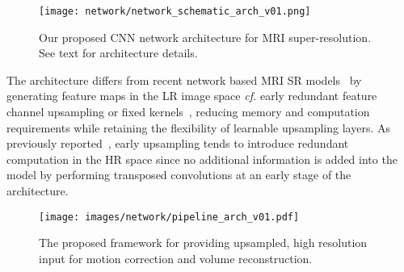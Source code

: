 \documentclass[runningheads,a4paper]{llncs}
\newcommand{\todo}[1]{}
\renewcommand{\todo}[1]{{\color{red} TODO: {#1}}}
\begin{document}

\begin{figure}[!htbp]
\centering
  \texttt{[image: network/network\_schematic\_arch\_v01.png]}
  \caption{Our proposed CNN network architecture for MRI super-resolution. See text for architecture details.}
  \label{fig:network}
\end{figure}

The architecture differs from recent network based MRI SR models~\cite{Oktay2016} by generating feature maps in the LR image space \emph{cf.} early redundant feature channel upsampling or fixed kernels~\cite{Dong2015}, reducing memory and computation requirements while retaining the flexibility of learnable upsampling layers. As previously reported~\cite{Shi2016}, early upsampling tends to introduce redundant computation in the HR space since no additional information is added into the model by performing transposed convolutions at an early stage of the architecture.

\begin{figure}[!htbp]
\centering
  \texttt{[image: images/network/pipeline\_arch\_v01.pdf]}
  \caption{The proposed framework for providing upsampled, high resolution input for motion correction and volume reconstruction.}
  \label{fig:pipeline}
\end{figure}
\end{document}
